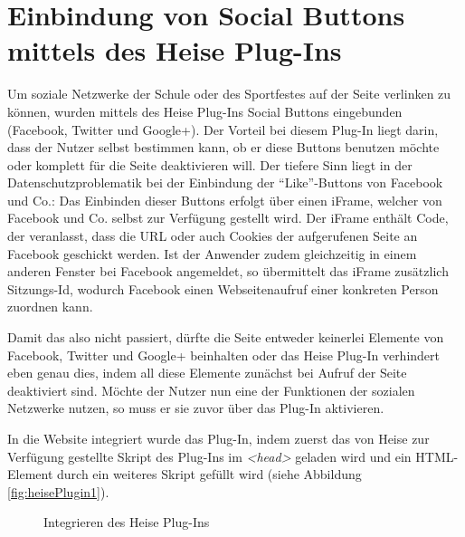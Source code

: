 \section{Einbindung von Social Buttons mittels des Heise Plug-Ins}
\label{Einbindung von Social Buttons mittels des Heise Plug-Ins}
Um soziale Netzwerke der Schule oder des Sportfestes auf der Seite verlinken zu können, wurden mittels des Heise Plug-Ins Social Buttons eingebunden (Facebook, Twitter und Google+). Der Vorteil bei diesem Plug-In liegt darin, dass der Nutzer selbst bestimmen kann, ob er diese Buttons benutzen möchte oder komplett für die Seite deaktivieren will. Der tiefere Sinn liegt in der Datenschutzproblematik bei der Einbindung der "`Like"'-Buttons von Facebook und Co.: Das Einbinden dieser Buttons erfolgt über einen iFrame, welcher von Facebook und Co. selbst zur Verfügung gestellt wird. Der iFrame enthält Code, der veranlasst, dass die URL oder auch Cookies der aufgerufenen Seite an Facebook geschickt werden. Ist der Anwender zudem gleichzeitig in einem anderen Fenster bei Facebook angemeldet, so übermittelt das iFrame zusätzlich Sitzungs-Id, wodurch Facebook einen Webseitenaufruf einer konkreten Person zuordnen kann.
\par
Damit das also nicht passiert, dürfte die Seite entweder keinerlei Elemente von Facebook, Twitter und Google+ beinhalten oder das Heise Plug-In verhindert eben genau dies, indem all diese Elemente zunächst bei Aufruf der Seite deaktiviert sind. Möchte der Nutzer nun eine der Funktionen der sozialen Netzwerke nutzen, so muss er sie zuvor über das Plug-In aktivieren.
\par
In die Website integriert wurde das Plug-In, indem zuerst das von Heise zur Verfügung gestellte Skript des Plug-Ins im \textit{<head>} geladen wird und ein HTML-Element durch ein weiteres Skript gefüllt wird (siehe Abbildung \vref{fig:heisePlugin1}).

\begin{figure}[!h]
	\caption{Integrieren des Heise Plug-Ins}
	\label{fig:heisePlugin1}
\end{figure}

